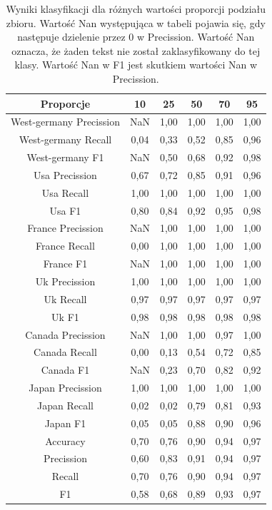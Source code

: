 \documentclass{classrep}
\begin{document}
\newpage
\begin{table}[h!]
\caption{Wyniki klasyfikacji dla różnych wartości proporcji podziału zbioru. Wartość Nan występująca w tabeli pojawia się, gdy następuje dzielenie przez 0 w Precission. Wartość Nan oznacza, że żaden tekst nie został zaklasyfikowany do tej klasy. Wartość Nan w F1 jest skutkiem wartości Nan w Precission. }
\centering
\vspace{0.1cm}
 \begin{tabular}{c c c c c c}

    \textbf{Proporcje} & \textbf{10}   & \textbf{25}  & \textbf{50}  & \textbf{70}  & \textbf{95}\\

\hline
West-germany Precission 	& NaN & 1,00 & 1,00 & 1,00 & 1,00\\
West-germany Recall 		& 0,04 & 0,33 & 0,52 & 0,85 & 0,96\\
West-germany F1		& NaN & 0,50 & 0,68 & 0,92 & 0,98\\
\hline
Usa Precission 			& 0,67 & 0,72 & 0,85 & 0,91 & 0,96\\
Usa Recall				& 1,00 & 1,00 & 1,00 & 1,00 & 1,00\\
Usa F1			 	& 0,80 & 0,84 & 0,92 & 0,95 & 0,98\\
\hline
France Precission 		& NaN & 1,00 & 1,00 & 1,00 & 1,00\\
France Recall 			& 0,00 & 1,00 & 1,00 & 1,00 & 1,00\\
France F1 				& NaN & 1,00 & 1,00 & 1,00 & 1,00\\
\hline
Uk Precission 			& 1,00 & 1,00 & 1,00 & 1,00 & 1,00\\
Uk Recall 				& 0,97 & 0,97 & 0,97 & 0,97 & 0,97\\
Uk F1 				& 0,98 & 0,98 & 0,98 & 0,98 & 0,98\\
\hline
Canada Precission		& NaN & 1,00 & 1,00 & 0,97 & 1,00\\
Canada Recall 			& 0,00 & 0,13 & 0,54 & 0,72 & 0,85\\
Canada F1 			& NaN & 0,23 & 0,70 & 0,82 & 0,92\\
\hline
Japan Precission 		& 1,00 & 1,00 & 1,00 & 1,00 & 1,00\\
Japan Recall 			& 0,02 & 0,02 & 0,79 & 0,81 & 0,93\\
Japan F1 				& 0,05 & 0,05 & 0,88 & 0,90 & 0,96\\
\hline
Accuracy 				& 0,70 & 0,76 & 0,90 & 0,94 & 0,97\\
Precission 				& 0,60 & 0,83 & 0,91 & 0,94 & 0,97\\
Recall 				& 0,70 & 0,76 & 0,90 & 0,94 & 0,97\\
F1 					& 0,58 & 0,68 & 0,89 & 0,93 & 0,97\\

\end {tabular}
\label {Wyniki klasyfikacji dla różnych wartości proporcji podziału zbioru.}
\end{table}
\end{document}
